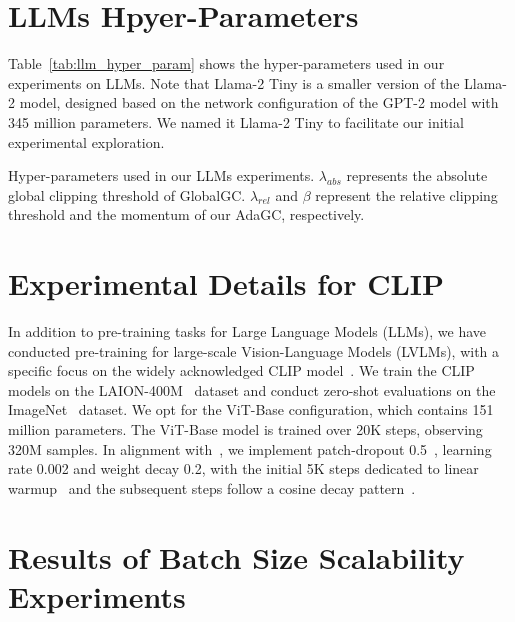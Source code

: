 \section{LLMs Hpyer-Parameters}\label{appendix:hyper_parameters}

Table~\ref{tab:llm_hyper_param} shows the hyper-parameters used in our experiments on LLMs. Note that Llama-2 Tiny is a smaller version of the Llama-2 model, designed based on the network configuration of the GPT-2 model with 345 million parameters. We named it Llama-2 Tiny to facilitate our initial experimental exploration.
\begin{table*}[!h]
    \centering
    \caption{Hyper-parameters used in our LLMs experiments. $\lambda_{abs}$ represents the absolute global clipping threshold of GlobalGC. $\lambda_{rel}$ and $\beta$ represent the relative clipping threshold and the momentum of our AdaGC, respectively.}
    \label{tab:llm_hyper_param}
    \vskip 0.1in
    \resizebox{0.6\linewidth}{!}{}
    \vskip -0.1in
\end{table*}






\section{Experimental Details for CLIP}


In addition to pre-training tasks for Large Language Models (LLMs), we have conducted pre-training for large-scale Vision-Language Models (LVLMs), with a specific focus on the widely acknowledged CLIP model~\cite{radford2021learning}. We train the CLIP models on the LAION-400M~\cite{schuhmann2021laion} dataset and conduct zero-shot evaluations on the ImageNet~\cite{russakovsky2015imagenet} dataset. We opt for the ViT-Base configuration, which contains 151 million parameters. The ViT-Base model is trained over 20K steps, observing 320M samples. In alignment with~\cite{wortsman2023stable}, we implement patch-dropout 0.5~\cite{li2023scaling}, learning rate 0.002 and weight decay 0.2, with the initial 5K steps dedicated to linear warmup~\cite{goyal2017accurate} and the subsequent steps follow a cosine decay pattern~\cite{loshchilov2016sgdr}.


\section{Results of Batch Size Scalability Experiments}
\label{appendix:llama_tiny_large_bs}


